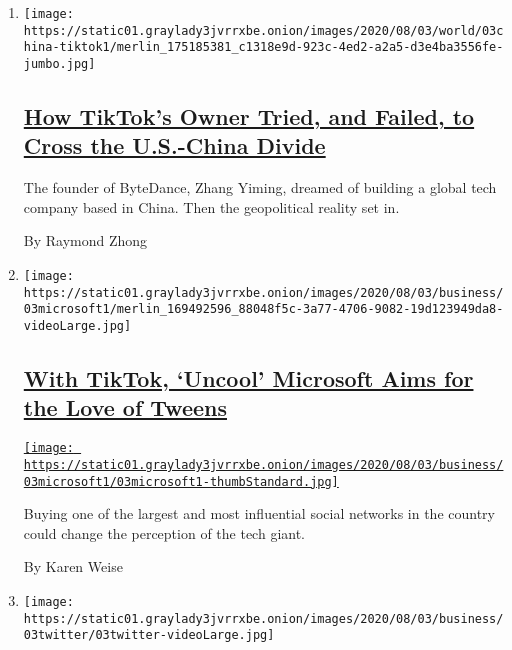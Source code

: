 \begin{enumerate}
\def\labelenumi{\arabic{enumi}.}
\item
  \texttt{[image: https://static01.graylady3jvrrxbe.onion/images/2020/08/03/world/03china-tiktok1/merlin\_175185381\_c1318e9d-923c-4ed2-a2a5-d3e4ba3556fe-jumbo.jpg]}

  \hypertarget{how-tiktoks-owner-tried-and-failed-to-cross-the-us-china-divide}{%
  \subsection{\texorpdfstring{\href{/2020/08/03/technology/tiktok-bytedance-us-china.html}{How
  TikTok's Owner Tried, and Failed, to Cross the U.S.-China
  Divide}}{How TikTok's Owner Tried, and Failed, to Cross the U.S.-China Divide}}\label{how-tiktoks-owner-tried-and-failed-to-cross-the-us-china-divide}}

  The founder of ByteDance, Zhang Yiming, dreamed of building a global
  tech company based in China. Then the geopolitical reality set in.

  By Raymond Zhong
\item
  \texttt{[image: https://static01.graylady3jvrrxbe.onion/images/2020/08/03/business/03microsoft1/merlin\_169492596\_88048f5c-3a77-4706-9082-19d123949da8-videoLarge.jpg]}

  \hypertarget{with-tiktok-uncool-microsoft-aims-for-the-love-of-tweens}{%
  \subsection{\texorpdfstring{\href{/2020/08/03/technology/tiktok-microsoft-tweens.html}{With
  TikTok, `Uncool' Microsoft Aims for the Love of
  Tweens}}{With TikTok, `Uncool' Microsoft Aims for the Love of Tweens}}\label{with-tiktok-uncool-microsoft-aims-for-the-love-of-tweens}}

  \href{/2020/08/03/technology/tiktok-microsoft-tweens.html}{\texttt{[image: https://static01.graylady3jvrrxbe.onion/images/2020/08/03/business/03microsoft1/03microsoft1-thumbStandard.jpg]}}

  Buying one of the largest and most influential social networks in the
  country could change the perception of the tech giant.

  By Karen Weise
\item
  \texttt{[image: https://static01.graylady3jvrrxbe.onion/images/2020/08/03/business/03twitter/03twitter-videoLarge.jpg]}

  \hypertarget{ftc-investigating-twitter-for-potential-privacy-violations}{%
}
\end{enumerate}
